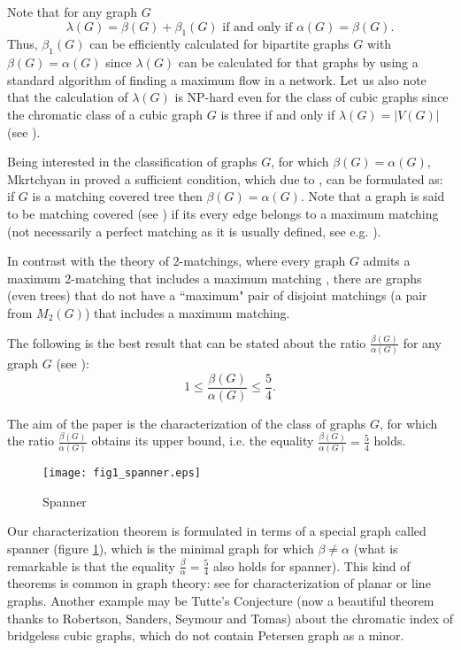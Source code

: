\documentclass[a4paper, 12pt]{article}
\begin{document}
Note that for any graph $G$ $$\lambda(G) = \beta(G) + \beta_1(G)
\text{ if and only if } \alpha(G) = \beta(G).$$ Thus, $\beta_1(G)$
can be efficiently calculated for bipartite graphs $G$ with
$\beta(G) = \alpha(G)$ since $\lambda(G)$ can be calculated for that
graphs by using a standard algorithm of finding a maximum flow in a
network. Let us also note that the calculation of $\lambda(G)$ is
NP-hard even for the class of cubic graphs since the chromatic class
of a cubic graph $G$ is three if and only if $\lambda(G) = |V(G)|$
(see \cite{Holyer}).

Being interested in the classification of graphs $G$, for which
$\beta(G) = \alpha(G)$, Mkrtchyan in \cite{MPP01} proved a
sufficient condition, which due to \cite{Har, Har-Plum}, can be
formulated as: if $G$ is a matching covered tree then $\beta(G) =
\alpha(G)$. Note that a graph is said to be matching covered (see
\cite{Perfect}) if its every edge belongs to a maximum matching (not
necessarily a perfect matching as it is usually defined, see e.g.
\cite{Lov-Plum}).

In contrast with the theory of 2-matchings, where every graph $G$
admits a maximum 2-matching that includes a maximum matching
\cite{Lov-Plum}, there are graphs (even trees) that do not have a
``maximum" pair of disjoint matchings (a pair from $M_2(G)$) that
includes a maximum matching.

The following is the best result that can be stated about the ratio
$\frac{\beta(G)}{\alpha(G)}$ for any graph $G$ (see \cite{VAV}):
$$1 \leq \frac{\beta(G)}{\alpha(G)} \leq \frac{5}{4}.$$

The aim of the paper is the characterization of the class of graphs
$G$, for which the ratio $\frac{\beta(G)}{\alpha(G)}$ obtains its
upper bound, i.e. the equality $\frac{\beta(G)}{\alpha(G)} =
\frac{5}{4}$ holds.

\begin{figure}[h]
\begin{center}
\texttt{[image: fig1\_spanner.eps]}\\
\caption{Spanner}\label{fig_spanner}
\end{center}
\end{figure}

Our characterization theorem is formulated in terms of a special
graph called spanner (figure \ref{fig_spanner}), which is the
minimal graph for which $\beta \neq \alpha$ (what is remarkable is
that the equality $\frac{\beta}{\alpha} = \frac{5}{4}$ also holds
for spanner). This kind of theorems is common in graph theory: see
\cite{Har} for characterization of planar or line graphs. Another
example may be Tutte's Conjecture (now a beautiful theorem thanks to
Robertson, Sanders, Seymour and Tomas) about the chromatic index of
bridgeless cubic graphs, which do not contain Petersen graph as a
minor.
\end{document}
